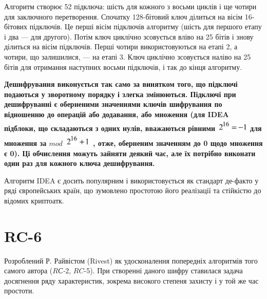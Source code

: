 {{{{{{{{{{{{{{{{{{\begin{definition}
{{{{{{{{{Алгоритм створює 52 підключа: шість для кожного з восьми циклів і ще чотири для
заключного перетворення. Спочатку 128-бітовий ключ ділиться на вісім 16-бітових
підключів. Це перші вісім підключів алгоритму (шість для першого етапу і два ---
для другого). Потім ключ циклічно зсовується вліво на 25 бітів і знову ділиться
на вісім підключів. Перші чотири використовуються на етапі 2, а чотири, що
залишилися, --- на етапі 3. Ключ циклічно зсовується наліво на 25 бітів для
отримання наступних восьми підключів, і так до кінця алгоритму.

{\bfseries
\textmd{Дешифрування виконується так само за винятком того, що
}\textmd{підключі}\textmd{ подаються у зворотному порядку і злегка змінюються. 
Підключі  при  дешифруванні  є  оберненими  значеннями  ключів  шифрування  по
відношенню до  операцій  або  додавання,  або  множення (для  IDEA  підблоки, 
що складаються  з  одних  нулів, вважаються рівними }
\includegraphics[width=0.5965in,height=0.2362in]{crypt-img/crypt-img302.png}
\textmd{ для множення за  }\textmd{$mod$}\textmd{ }
\includegraphics[width=0.5043in,height=0.252in]{crypt-img/crypt-img303.png}
\textmd{, отже, оберненим значенням до }\textmd{0 }\textmd{щодо множення є 0).
Ці обчислення можуть зайняти деякий час, але їх потрібно виконати один раз для 
кожного  ключа  дешифрування.  }}


\bigskip

Алгоритм IDEA є досить популярним і використовується як стандарт де-факто у ряді
європейських країн, що зумовлено простотою його реалізації та стійкістю до
відомих криптоатк.


\bigskip


\bigskip

\section{RC-6}


\bigskip

Розроблений Р. Райвістом (Rivest) як удосконалення попередніх алгоритмів того
самого автора ($R$\textit{С-}2, $RC$-5). При створенні даного
шифру ставилася задача досягнення ряду характеристик, зокрема високого степеня
захисту і у той же час простоти.


\bigskip

}}}}}}}}}
\end{definition}}}}}}}}}}}}}}}}}}}
